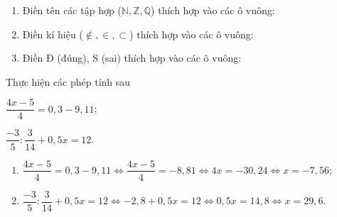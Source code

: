 \btvn
\begin{vn}
\begin{enumerate}[1)]
\item Điền tên các tập hợp ($\mathbb{N, Z, Q}$) thích hợp vào các ô vuông:
\item Điền kí hiệu ($\not\in,\in,\subset$) thích hợp vào các ô vuông:
\item Điền Đ (đúng), S (sai) thích hợp vào các ô vuông:
\end{enumerate}
\end{vn}
\begin{vn}
Thực hiện các phép tính sau
\begin{listEX}[2]
\item $\dfrac{4x-5}{4}=0{,}3-9{,}11$;
\item $\dfrac{-3}{5}:\dfrac{3}{14}+0{,}5x=12$.
\end{listEX}
\loigiai
{
\begin{enumerate}
\item $\dfrac{4x-5}{4}=0{,}3-9{,}11\Leftrightarrow\dfrac{4x-5}{4}=-8,81\Leftrightarrow 4x=-30,24\Leftrightarrow x=-7,56$;
\item $\dfrac{-3}{5}:\dfrac{3}{14}+0{,}5x=12\Leftrightarrow -2,8+0,5x=12\Leftrightarrow 0,5x=14,8\Leftrightarrow x=29,6$.
\end{enumerate}
}
\end{vn}
